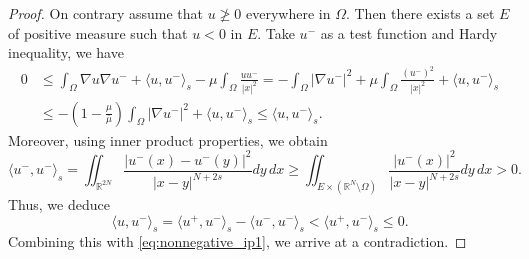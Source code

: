 \documentclass[11pt]{article}
\newcommand{\om} {\Omega}
\begin{document}
\begin{proof}
On contrary assume that $u \not \geq 0 $ everywhere in $\om$. Then there exists a set \( E \) of positive measure such that \( u < 0 \) in \( E \). 
Take \( u^- \) as a test function and Hardy inequality, we have
\begin{equation}\label{eq:nonnegative_ip1}
\begin{aligned}
0  &\leq \int_{\Omega} \nabla u  \nabla u^- + \langle u, u^- \rangle_{s} - \mu \int_{\Omega} \frac{u u^-}{|x|^2}  = -\int_{\Omega} |\nabla u^-|^2 + \mu \int_{\Omega} \frac{(u^-)^2}{|x|^2} + \langle u, u^-\rangle_s \\
& \leq - \left(1 - \frac{\mu}{\bar{\mu}} \right) \int_{\Omega} |\nabla u^-|^2 +  \langle u, u^-\rangle_s \leq \langle u , u^- \rangle_s.
\end{aligned}
\end{equation}
Moreover, using inner product properties, we obtain
\begin{equation*}
\langle u^-, u^- \rangle_{s} = \iint_{\mathbb{R}^{2N}} \frac{|u^-(x) - u^-(y)|^2}{|x - y|^{N+2s}} dy\, dx
\geq \iint_{E \times (\mathbb{R}^N \setminus \Omega)} \frac{|u^-(x)|^2}{|x - y|^{N+2s}} dy\, dx > 0.
\end{equation*}
Thus, we deduce
\begin{equation*}
\langle u, u^- \rangle_{s} = \langle u^+, u^- \rangle_{s} - \langle u^-, u^- \rangle_{s}
< \langle u^+, u^- \rangle_{s} \leq 0.
\end{equation*}
Combining this with \eqref{eq:nonnegative_ip1}, we arrive at a contradiction. 
\end{proof}
\end{document}

